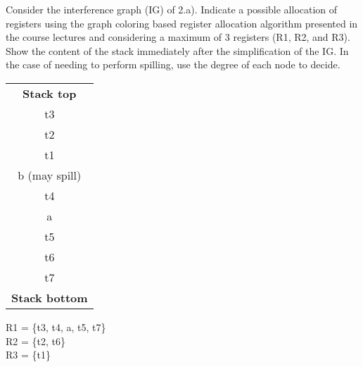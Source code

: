 \documentclass[docid=2020]{comp_test2}
\begin{document}
\begin{minipage}{0.41\textwidth}
\begin{center}
    \footnotesize
\end{center}
\end{minipage}

\question
Consider the interference graph (IG) of 2.a). Indicate a possible allocation of registers using the graph coloring based register allocation algorithm presented in the course lectures and considering a maximum of 3 registers (R1, R2, and R3). Show the content of the stack immediately after the simplification of the IG. In the case of needing to perform spilling, use the degree of each node to decide.

\ansseparator

\noindent
\begin{minipage}{0.25\textwidth}
\begin{center}
    \begin{tabular}{| c |}
        \textbf{Stack top} \\ \cline{1-1}
        t3 \\
        t2 \\
        t1 \\
        b (may spill) \\
        t4 \\
        a \\
        t5 \\
        t6 \\
        t7 \\ \cline{1-1}
        \textbf{Stack bottom}
    \end{tabular}
\end{center}
\end{minipage}
\begin{minipage}{0.74\textwidth}
    R1 = \{t3, t4, a, t5, t7\} \\
    R2 = \{t2, t6\} \\
    R3 = \{t1\}
\end{minipage}
\end{document}
